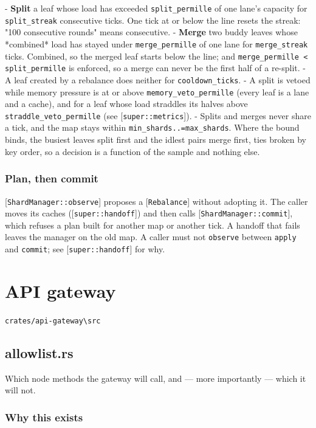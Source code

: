 \documentclass[11pt,a4paper]{article}
\begin{document}
- \textbf{Split} a leaf whose load has exceeded \texttt{split\_permille} of one lane's
  capacity for \texttt{split\_streak} consecutive ticks. One tick at or below the
  line resets the streak: "100 consecutive rounds" means consecutive.
- \textbf{Merge} two buddy leaves whose *combined* load has stayed under
  \texttt{merge\_permille} of one lane for \texttt{merge\_streak} ticks. Combined, so the
  merged leaf starts below the line; and \texttt{merge\_permille < split\_permille}
  is enforced, so a merge can never be the first half of a re-split.
- A leaf created by a rebalance does neither for \texttt{cooldown\_ticks}.
- A split is vetoed while memory pressure is at or above
  \texttt{memory\_veto\_permille} (every leaf is a lane and a cache), and for a leaf
  whose load straddles its halves above \texttt{straddle\_veto\_permille} (see
  [\texttt{super::metrics}]).
- Splits and merges never share a tick, and the map stays within
  \texttt{min\_shards..=max\_shards}. Where the bound binds, the busiest leaves split
  first and the idlest pairs merge first, ties broken by key order, so a
  decision is a function of the sample and nothing else.

\subsubsection{Plan, then commit}

[\texttt{ShardManager::observe}] proposes a [\texttt{Rebalance}] without adopting it. The
caller moves its caches ([\texttt{super::handoff}]) and then calls
[\texttt{ShardManager::commit}], which refuses a plan built for another map or
another tick. A handoff that fails leaves the manager on the old map. A
caller must not \texttt{observe} between \texttt{apply} and \texttt{commit}; see
[\texttt{super::handoff}] for why.

\section{API gateway}
\noindent\texttt{crates/api-gateway\textbackslash{}src}

\subsection{allowlist.rs}
Which node methods the gateway will call, and — more importantly — which it
will not.

\subsubsection{Why this exists}
\end{document}
